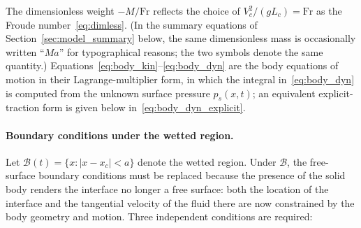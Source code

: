 \documentclass{article}
\newcommand{\Fr}{\mathrm{Fr}}
\begin{document}
\color{black}
The dimensionless weight $-M/\Fr$ reflects the choice of $V_c^2/(g L_c) = \Fr$ as the Froude number~\eqref{eq:dimless}.
(In the summary equations of Section~\ref{sec:model_summary} below, the same dimensionless mass is occasionally written ``$Ma$'' for typographical reasons; the two symbols denote the same quantity.)
Equations~\eqref{eq:body_kin}--\eqref{eq:body_dyn} are the body equations of motion in their Lagrange-multiplier form, in which the integral in~\eqref{eq:body_dyn} is computed from the unknown surface pressure $p_s(x, t)$; an equivalent explicit-traction form is given below in~\eqref{eq:body_dyn_explicit}.

\paragraph{Boundary conditions under the wetted region.}
Let $\mathcal{B}(t) = \{x : |x - x_c| < a\}$ denote the wetted region.
Under $\mathcal{B}$, the free-surface boundary conditions must be replaced because the presence of the solid body renders the interface no longer a free surface: both the location of the interface and the tangential velocity of the fluid there are now constrained by the body geometry and motion.
Three independent conditions are required:
\end{document}
